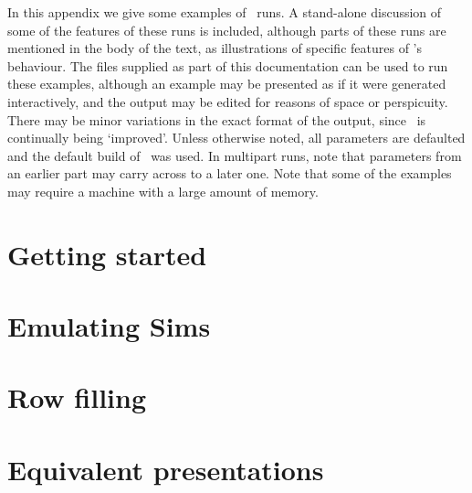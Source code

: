 


In this appendix we give some examples of \ace\ runs.
A stand-alone discussion of some of the features of these runs is included,
  although parts of these runs are mentioned in the body of the text, as 
  illustrations of specific features of \ace's behaviour.
The  files supplied as part of this documentation can be
  used to run these examples, although an example may be presented as if it
  were generated interactively, and the output may be edited for reasons of
  space or perspicuity.
There may be minor variations in the exact format of the output, since
  \ace\ is continually being `improved'\kern-1pt.
Unless otherwise noted, all parameters are defaulted and the default
  build of \ace\ was used.
In multipart runs, note that parameters from an earlier part may carry
  across to a later one.
Note that some of the examples may require a machine with a large amount
  of memory.

\section{Getting started}\label{ex000}


\section{Emulating Sims}\label{ex001}


\section{Row filling}\label{ex002}


\section{Equivalent presentations}

